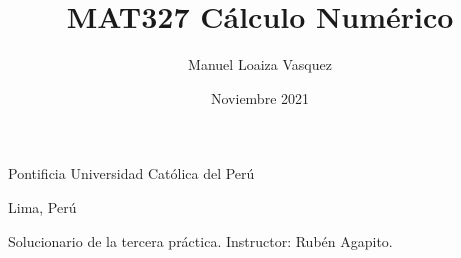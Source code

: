 \title{MAT327 C\'alculo Num\'erico}
\author{Manuel Loaiza Vasquez}
\date{Noviembre 2021}



\maketitle

\vspace*{-0.25in}
\centerline{Pontificia Universidad Cat\'olica del Per\'u}
\centerline{Lima, Per\'u}
\centerline{}
\vspace*{0.15in}

\begin{framed}
  Solucionario de la tercera pr\'actica. Instructor: Rub\'en Agapito.
\end{framed}












